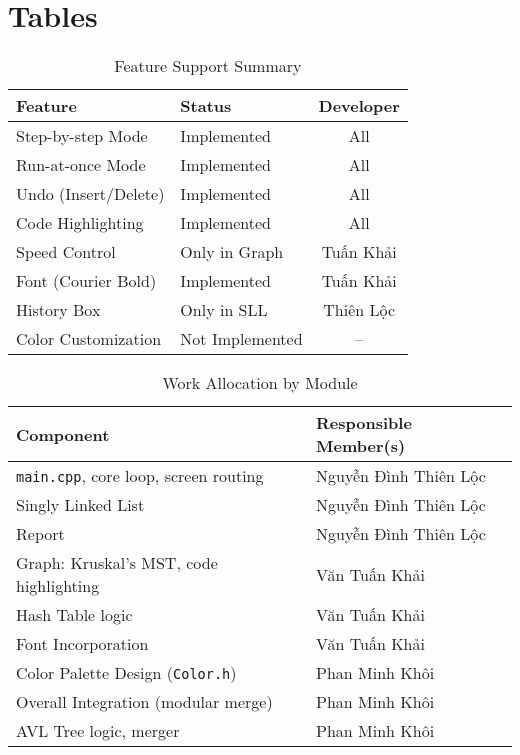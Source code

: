 \clearpage
\section{Tables}
\label{sec:tables}

\begin{table}[H]
\centering
\begin{tabular}{|l|l|c|}
\hline
\textbf{Feature} & \textbf{Status} & \textbf{Developer} \\
\hline
Step-by-step Mode & Implemented & All \\
Run-at-once Mode & Implemented & All \\
Undo (Insert/Delete) & Implemented & All \\
Code Highlighting & Implemented & All \\
Speed Control & Only in Graph & Tuấn Khải \\
Font (Courier Bold) & Implemented & Tuấn Khải\\
History Box & Only in SLL & Thiên Lộc\\
Color Customization & Not Implemented & -- \\

\hline
\end{tabular}
\caption{Feature Support Summary}
\label{tab:feature_summary}
\end{table}

\begin{table}[H]
\centering
\begin{tabularx}{\textwidth}{|l|X|}
\hline
\textbf{Component} & \textbf{Responsible Member(s)} \\
\hline
\texttt{main.cpp}, core loop, screen routing & Nguyễn Đình Thiên Lộc \\
Singly Linked List & Nguyễn Đình Thiên Lộc \\
Report & Nguyễn Đình Thiên Lộc \\
Graph: Kruskal's MST, code highlighting & Văn Tuấn Khải \\
Hash Table logic & Văn Tuấn Khải \\
Font Incorporation & Văn Tuấn Khải \\
Color Palette Design (\texttt{Color.h}) & Phan Minh Khôi \\
Overall Integration (modular merge) & Phan Minh Khôi \\
AVL Tree logic, merger & Phan Minh Khôi \\
\hline
\end{tabularx}
\caption{Work Allocation by Module}
\label{tab:work_allocation}
\end{table}